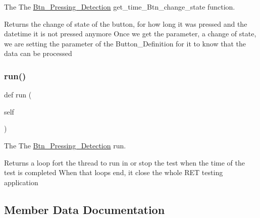 The The \hyperlink{a00029}{Btn\+\_\+\+Pressing\+\_\+\+Detection} get\+\_\+time\+\_\+\+Btn\+\_\+change\+\_\+state function. 

\begin{DoxyReturn}{Returns}
the change of state of the button, for how long it was pressed and the datetime it is not pressed anymore Once we get the parameter, a change of state, we are setting the parameter of the Button\+\_\+\+Definition for it to know that the data can be processed 
\end{DoxyReturn}
\mbox{\label{a00029_ad22709b2e67308af35f55680d5a026e0}} 
\subsubsection{\texorpdfstring{run()}{run()}}
{\footnotesize\ttfamily def run (\begin{DoxyParamCaption}\item[{}]{self }\end{DoxyParamCaption})}



The The \hyperlink{a00029}{Btn\+\_\+\+Pressing\+\_\+\+Detection} run. 

\begin{DoxyReturn}{Returns}
a loop fort the thread to run in or stop the test when the time of the test is completed When that loops end, it close the whole R\+ET testing application 
\end{DoxyReturn}


\subsection{Member Data Documentation}
\mbox{\label{a00029_abd224cfc80b136898df89af7812fa8d5}} 
